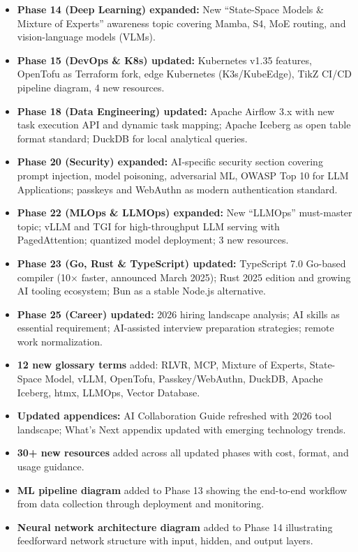 \documentclass[11pt, a4paper, oneside]{report}
\begin{document}
\begin{itemize}[leftmargin=*]
\item \textbf{Phase 14 (Deep Learning) expanded:} New ``State-Space Models \& Mixture of Experts'' awareness topic covering Mamba, S4, MoE routing, and vision-language models (VLMs).
\item \textbf{Phase 15 (DevOps \& K8s) updated:} Kubernetes v1.35 features, OpenTofu as Terraform fork, edge Kubernetes (K3s/KubeEdge), TikZ CI/CD pipeline diagram, 4 new resources.
\item \textbf{Phase 18 (Data Engineering) updated:} Apache Airflow 3.x with new task execution API and dynamic task mapping; Apache Iceberg as open table format standard; DuckDB for local analytical queries.
\item \textbf{Phase 20 (Security) expanded:} AI-specific security section covering prompt injection, model poisoning, adversarial ML, OWASP Top 10 for LLM Applications; passkeys and WebAuthn as modern authentication standard.
\item \textbf{Phase 22 (MLOps \& LLMOps) expanded:} New ``LLMOps'' must-master topic; vLLM and TGI for high-throughput LLM serving with PagedAttention; quantized model deployment; 3 new resources.
\item \textbf{Phase 23 (Go, Rust \& TypeScript) updated:} TypeScript 7.0 Go-based compiler (10$\times$ faster, announced March 2025); Rust 2025 edition and growing AI tooling ecosystem; Bun as a stable Node.js alternative.
\item \textbf{Phase 25 (Career) updated:} 2026 hiring landscape analysis; AI skills as essential requirement; AI-assisted interview preparation strategies; remote work normalization.
\item \textbf{12 new glossary terms} added: RLVR, MCP, Mixture of Experts, State-Space Model, vLLM, OpenTofu, Passkey/WebAuthn, DuckDB, Apache Iceberg, htmx, LLMOps, Vector Database.
\item \textbf{Updated appendices:} AI Collaboration Guide refreshed with 2026 tool landscape; What's Next appendix updated with emerging technology trends.
\item \textbf{30+ new resources} added across all updated phases with cost, format, and usage guidance.
\item \textbf{ML pipeline diagram} added to Phase 13 showing the end-to-end workflow from data collection through deployment and monitoring.
\item \textbf{Neural network architecture diagram} added to Phase 14 illustrating feedforward network structure with input, hidden, and output layers.

\end{itemize}
\end{document}
